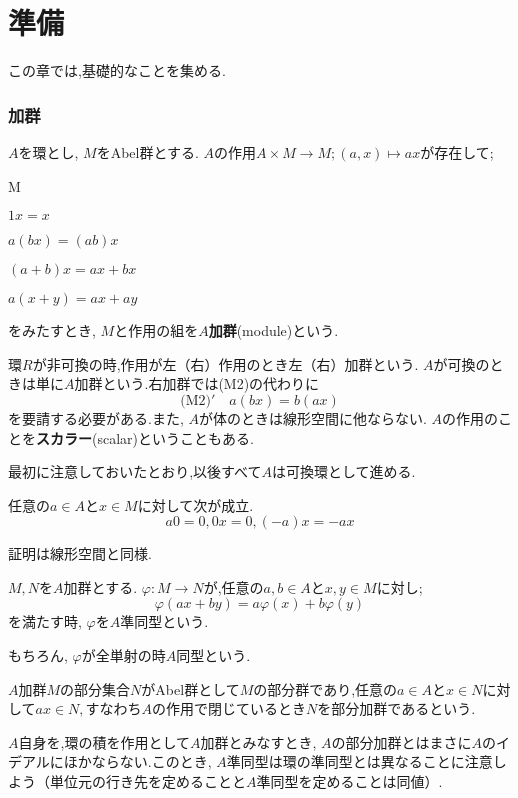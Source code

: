 \part[Preliminaries]{準備}
この章では,基礎的なことを集める.


\section{加群}

\begin{defi}[加群]
	$A$を環とし, $M$をAbel群とする. $A$の作用$A\times M\to M;(a,x)\mapsto ax$が存在して;
	\begin{defiterm}{M}
		\item $1x=x$
		\item $a(bx)=(ab)x$
		\item $(a+b)x=ax+bx$
		\item $a(x+y)=ax+ay$
	\end{defiterm}
	をみたすとき, $M$と作用の組を$A$\textbf{加群}(module)という.
\end{defi}

環$R$が非可換の時,作用が左（右）作用のとき左（右）加群という. $A$が可換のときは単に$A$加群という.右加群では(M2)の代わりに
\[\textrm{(M2)}'\quad a(bx)=b(ax)\]
を要請する必要がある.また, $A$が体のときは線形空間に他ならない. $A$の作用のことを\textbf{スカラー}(scalar)ということもある.

最初に注意しておいたとおり,以後すべて$A$は可換環として進める.
\begin{prop}
	任意の$a\in A$と$x\in M$に対して次が成立.
	\[a0=0,0x=0,(-a)x=-ax\]
\end{prop}

証明は線形空間と同様.

\begin{defi}[準同型]
	$M,N$を$A$加群とする. $\varphi:M\to N$が,任意の$a,b\in A$と$x,y\in M$に対し;
	\[\varphi(ax+by)=a\varphi(x)+b\varphi(y)\]
	を満たす時, $\varphi$を$A$準同型という.
\end{defi}

もちろん, $\varphi$が全単射の時$A$同型という.

\begin{defi}[部分加群]
	$A$加群$M$の部分集合$N$がAbel群として$M$の部分群であり,任意の$a\in A$と$x\in N$に対して$ax\in N, $すなわち$A$の作用で閉じているとき$N$を部分加群であるという.
\end{defi}

$A$自身を,環の積を作用として$A$加群とみなすとき, $A$の部分加群とはまさに$A$のイデアルにほかならない.このとき, $A$準同型は環の準同型とは異なることに注意しよう（単位元の行き先を定めることと$A$準同型を定めることは同値）.

